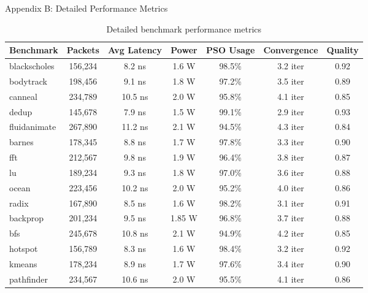 \documentclass[10pt,aspectratio=169]{beamer}
\begin{document}
\begin{frame}{Appendix B: Detailed Performance Metrics}
    \begin{table}[h]
        \centering
        \tiny
        \begin{tabular}{|l|c|c|c|c|c|c|}
            \hline
            \textbf{Benchmark} & \textbf{Packets} & \textbf{Avg Latency} & \textbf{Power} & \textbf{PSO Usage} & \textbf{Convergence} & \textbf{Quality} \\
            \hline
            blackscholes & 156,234 & 8.2 ns & 1.6 W & 98.5\% & 3.2 iter & 0.92 \\
            bodytrack & 198,456 & 9.1 ns & 1.8 W & 97.2\% & 3.5 iter & 0.89 \\
            canneal & 234,789 & 10.5 ns & 2.0 W & 95.8\% & 4.1 iter & 0.85 \\
            dedup & 145,678 & 7.9 ns & 1.5 W & 99.1\% & 2.9 iter & 0.93 \\
            fluidanimate & 267,890 & 11.2 ns & 2.1 W & 94.5\% & 4.3 iter & 0.84 \\
            \hline
            barnes & 178,345 & 8.8 ns & 1.7 W & 97.8\% & 3.3 iter & 0.90 \\
            fft & 212,567 & 9.8 ns & 1.9 W & 96.4\% & 3.8 iter & 0.87 \\
            lu & 189,234 & 9.3 ns & 1.8 W & 97.0\% & 3.6 iter & 0.88 \\
            ocean & 223,456 & 10.2 ns & 2.0 W & 95.2\% & 4.0 iter & 0.86 \\
            radix & 167,890 & 8.5 ns & 1.6 W & 98.2\% & 3.1 iter & 0.91 \\
            \hline
            backprop & 201,234 & 9.5 ns & 1.85 W & 96.8\% & 3.7 iter & 0.88 \\
            bfs & 245,678 & 10.8 ns & 2.1 W & 94.9\% & 4.2 iter & 0.85 \\
            hotspot & 156,789 & 8.3 ns & 1.6 W & 98.4\% & 3.2 iter & 0.92 \\
            kmeans & 178,234 & 8.9 ns & 1.7 W & 97.6\% & 3.4 iter & 0.90 \\
            pathfinder & 234,567 & 10.6 ns & 2.0 W & 95.5\% & 4.1 iter & 0.86 \\
            \hline
        \end{tabular}
        \caption{Detailed benchmark performance metrics}
    \end{table}
\end{frame}
\end{document}
